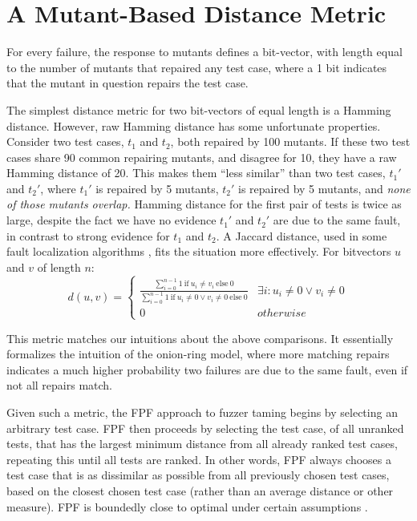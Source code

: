 \section{A Mutant-Based Distance Metric}

For every failure, the response to mutants defines a bit-vector, with
length equal to the number of mutants that repaired any test case,
where a 1 bit indicates that the mutant in question repairs the test
case.

The simplest distance metric for two bit-vectors of equal length is a
Hamming distance.  However, raw Hamming distance has some unfortunate
properties.  Consider two test cases, $t_1$ and $t_2$, both repaired
by 100 mutants.  If these two test cases share 90 common repairing
mutants, and disagree for 10, they have a raw Hamming
distance of 20.  This makes them ``less similar'' than two test cases,
$t_1'$ and $t_2'$, where $t_1'$ is repaired by 5 mutants, $t_2'$ is
repaired by 5 mutants, and \emph{none of those mutants overlap.}   Hamming distance for the first pair of tests is twice as
large, despite the fact we have no evidence $t_1'$ and
$t_2'$ are due to the same fault, in contrast to strong evidence for $t_1$ and $t_2$.  A Jaccard distance, used in some fault
localization algorithms \cite{Liu06}, fits the situation more
effectively.  For bitvectors $u$ and $v$ of length $n$:
\[d(u,v) = 
\begin{cases}
\frac{\sum_{i=0}^{n-1} 1\ \text{if}\ u_i \neq v_i\ \text{else}\ 0}{\sum_{i=0}^{n-1} 1
\  \text{if}\ u_i \neq 0 \vee v_i \neq 0\ \text{else}\ 0} & \exists i:u_i\neq 0 \vee v_i\neq 0\\
0 & otherwise
\end{cases}
\]

This metric matches our intuitions about the above comparisons.  It
essentially formalizes the intuition of the onion-ring model, where
more matching repairs indicates a much higher probability two failures
are due to the same fault, even if not all repairs match.

Given such a metric, the FPF \cite{Gonzalez} approach to fuzzer taming \cite{PLDI13}
begins by selecting an arbitrary test case.   FPF then proceeds by selecting the test
case, of all unranked tests, that has the largest minimum distance
from all already ranked test cases, repeating this until all tests are
ranked.  In other words, FPF always chooses a test case that is as dissimilar as
possible from all previously chosen test cases, based on the closest
chosen test case (rather than an average distance or other measure).  FPF is boundedly close
to optimal under certain assumptions \cite{Gonzalez}.

